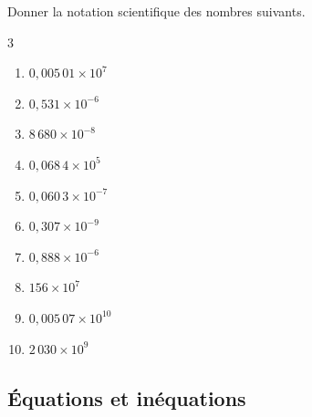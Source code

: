 {\begin{Exercice}
Donner la notation scientifique des nombres suivants.
\vspace{-0.5cm}
\begin{multicols}{3}
\begin{enumerate}[itemsep=1em]
	\item \begin{minipage}[t]{\linewidth}$0{,}005\,01 \times 10^{7}$\end{minipage}
	\item \begin{minipage}[t]{\linewidth}$0{,}531 \times 10^{-6}$\end{minipage}
	\item \begin{minipage}[t]{\linewidth}$8\,680 \times 10^{-8}$\end{minipage}
	\item \begin{minipage}[t]{\linewidth}$0{,}068\,4 \times 10^{5}$\end{minipage}
	\item \begin{minipage}[t]{\linewidth}$0{,}060\,3 \times 10^{-7}$\end{minipage}
	\item \begin{minipage}[t]{\linewidth}$0{,}307 \times 10^{-9}$\end{minipage}
	\item \begin{minipage}[t]{\linewidth}$0{,}888 \times 10^{-6}$\end{minipage}
	\item \begin{minipage}[t]{\linewidth}$156 \times 10^{7}$\end{minipage}
	\item \begin{minipage}[t]{\linewidth}$0{,}005\,07 \times 10^{10}$\end{minipage}
	\item \begin{minipage}[t]{\linewidth}$2\,030 \times 10^{9}$\end{minipage}
\end{enumerate}
\end{multicols}
\vspace{-0.5cm}
\end{Exercice}


\subsection*{Équations et inéquations}
}

